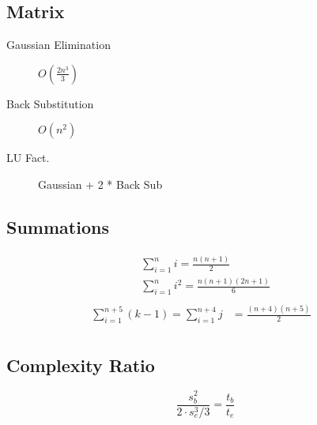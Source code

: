 \documentclass[10pt]{article}
\begin{document}
\begin{multicols}{3}
    \begin{minipage}{\columnwidth}
        \subsection*{Matrix}
        \begin{description}
            \item[Gaussian Elimination] \(O(\frac{2n^3}{3})\)
            \item[Back Substitution] \(O(n^2)\)
            \item[LU Fact.] Gaussian + 2 * Back Sub
        \end{description}
    \end{minipage}

    \begin{minipage}{\columnwidth}
        \subsection*{Summations}
        \begin{multicols}{2}
            \vspace*{-2em}
            \begin{equation*}
                \begin{aligned}
                    & \sum_{i=1}^{n} i = \frac{n(n+1)}{2} & \\
                    & \sum_{i=1}^{n} i^2 = \frac{n(n+1)(2n+1)}{6} & \\
                \end{aligned}
            \end{equation*}
            \columnbreak
            \vspace*{-2.0em}
            \begin{equation*}
                \begin{aligned}
                    \sum_{i=1}^{n+5}{(k-1)} = \sum_{i=1}^{n+4} j & = \frac{(n+4)(n+5)}{2} & \\
                \end{aligned}
            \end{equation*}
        \end{multicols}
    \end{minipage}

    \begin{minipage}{1.3\columnwidth}
        \begin{center}
            \subsection*{Complexity Ratio}
        \end{center}
        \begin{equation*}
            \frac{s_b^2}{2\cdot s_e^3 / 3} = \frac{t_b}{t_e}
        \end{equation*}
    \end{minipage}
\end{multicols}
\end{document}
